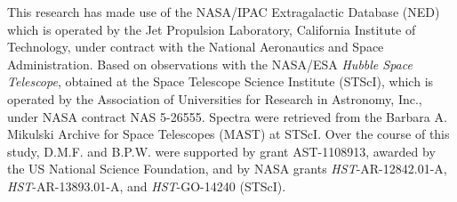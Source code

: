 \documentclass[twocolumn,tighten]{aastex6}
\begin{document}
\acknowledgements

This research has made use of the NASA/IPAC Extragalactic Database (NED) which is operated by the Jet Propulsion Laboratory, California Institute of Technology, under contract with the National Aeronautics and Space Administration. Based on observations with the NASA/ESA \textit{Hubble Space Telescope}, obtained at the Space Telescope Science Institute (STScI), which is operated by the Association of Universities for Research in Astronomy, Inc., under NASA contract NAS 5-26555. Spectra were retrieved from the Barbara A. Mikulski Archive for Space Telescopes (MAST) at STScI. Over the course of this study, D.M.F. and B.P.W. were supported by grant AST-1108913, awarded by the US National Science Foundation, and by NASA grants \textit{HST}-AR-12842.01-A, \textit{HST}-AR-13893.01-A, and \textit{HST}-GO-14240 (STScI).



\nocite{*}


\end{document}
